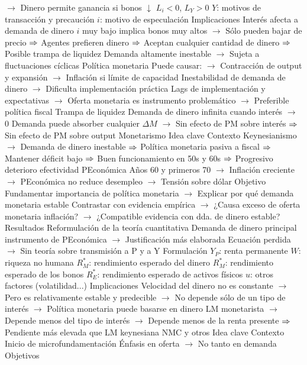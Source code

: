 \documentclass{nuevotema}
\begin{document}
\begin{esquemal}
				\4[] $\to$ Dinero permite ganancia si bonos $\downarrow$
				\4[] 
				\4[] $L_i < 0$, $L_Y > 0$
				\4[] $Y$: motivos de transacción y precaución
				\4[] $i$: motivo de especulación
			\3 Implicaciones
				\4 Interés afecta a demanda de dinero
				\4[] $i$ muy bajo implica bonos muy altos
				\4[] $\to$ Sólo pueden bajar de precio
				\4[] $\Rightarrow$ Agentes prefieren dinero
				\4[] $\Rightarrow$ Aceptan cualquier cantidad de dinero
				\4[] $\Rightarrow$ Posible trampa de liquidez
				\4 Demanda altamente inestable
				\4[] $\to$ Sujeta a fluctuaciones cíclicas
				\4 Política monetaria
				\4[] Puede causar:
				\4[] $\to$ Contracción de output y expansión
				\4[] $\to$ Inflación si límite de capacidad
				\4[] Inestabilidad de demanda de dinero
				\4[] $\to$ Dificulta implementación práctica
				\4[] Lags de implementación y expectativas
				\4[] $\to$ Oferta monetaria es instrumento problemático
				\4[] $\to$ Preferible política fiscal
				\4 Trampa de liquidez
				\4[] Demanda de dinero infinita cuando interés $\to$ 0
				\4[] Demanda puede absorber cualquier $\Delta M$
				\4[] $\to$ Sin efecto de PM sobre interés
				\4[] $\Rightarrow$ Sin efecto de PM sobre output
		\2 Monetarismo
			\3 Idea clave
				\4 Contexto
				\4[] Keynesianismo
				\4[] $\to$ Demanda de dinero inestable
				\4[] $\Rightarrow$ Política monetaria pasiva a fiscal
				\4[] $\Rightarrow$ Mantener déficit bajo
				\4[] $\Rightarrow$ Buen funcionamiento en 50s y 60s
				\4[] $\Rightarrow$ Progresivo deterioro efectividad PEconómica
				\4[] Años 60 y primeros 70
				\4[] $\to$ Inflación creciente
				\4[] $\to$ PEconómica no reduce desempleo
				\4[] $\to$ Tensión sobre dólar
				\4 Objetivo
				\4[] Fundamentar importancia de política monetaria
				\4[] $\to$ Explicar por qué demanda monetaria estable
				\4[] Contrastar con evidencia empírica
				\4[] $\to$ ¿Causa exceso de oferta monetaria inflación?
				\4[] $\to$ ¿Compatible evidencia con dda. de dinero estable?
				\4 Resultados
				\4[] Reformulación de la teoría cuantitativa
				\4[] Demanda de dinero principal instrumento de PEconómica
				\4[] $\to$ Justificación más elaborada
				\4[] Ecuación perdida
				\4[] $\to$ Sin teoría sobre transmisión a P y a Y
			\3 Formulación
				\4 
				\4[] $Y_P$: renta permanente
				\4[] $W$: riqueza no humana
				\4[] $R_M^*$: rendimiento esperado del dinero
				\4[] $R_M^*$: rendimiento esperado de los bonos
				\4[] $R_E^*$: rendimiento esperado de activos físicos
				\4[] $u$: otros factores (volatilidad...)
			\3 Implicaciones
				\4 Velocidad del dinero no es constante
				\4[] $\to$ Pero es relativamente estable y predecible
				\4[] $\to$ No depende sólo de un tipo de interés
				\4[] $\to$ Política monetaria puede basarse en dinero
				\4 LM monetarista
				\4[] $\to$ Depende menos del tipo de interés
				\4[] $\to$ Depende menos de la renta presente
				\4[] $\Rightarrow$ Pendiente más elevada que LM keynesiana
		\2 NMC y otros
			\3 Idea clave
				\4 Contexto
				\4[] Inicio de microfundamentación
				\4[] Énfasis en oferta
				\4[] $\to$ No tanto en demanda
				\4 Objetivos
				

\end{esquemal}
\end{document}
